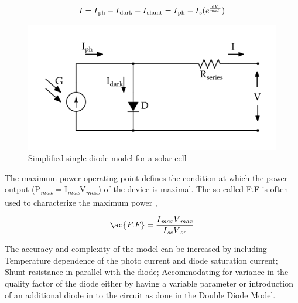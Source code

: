     \begin{equation}
    \begin{aligned}
     I = I\textsubscript{ph} - I\textsubscript{dark} - I\textsubscript{shunt} = I\textsubscript{ph} -  I\textsubscript{s} (e^{\frac{eV}{\textit{mk}T}})
      \label{eq:equ_new_cell_current}
      \end{aligned}
      \end{equation}
  
     
 \begin{figure}[H]
   \begin{center}
   \includegraphics[width=\textwidth]{images/simplified_single_diode_model_simple}
   \caption{ Simplified single diode model for a solar cell }
   \label{fig:simple_EQu_cell}
   \end{center}
   \end{figure}

The maximum-power operating point defines the condition at which the power output (P\textsubscript{\textit{max}} = I\textsubscript{\textit{max}}V\textsubscript{\textit{max}}) of the device is maximal.
The so-called \ac{F.F} is often used to characterize the maximum power ,

\begin{equation}
 \begin{aligned}
  \ac{F.F} = \dfrac{I\textsubscript{\textit{max}}V\textsubscript{\textit{max}}}{I\textsubscript{\textit{sc}}V\textsubscript{\textit{oc}}}
   \label{eq:equ_current_new}
   \end{aligned}
   \end{equation}
   
The accuracy and complexity of the model can be increased by including Temperature dependence of the photo current and diode saturation current; Shunt resistance in parallel with the diode; Accommodating for variance in the quality factor of the diode either by having a variable parameter or introduction of an additional diode in to the circuit as done in the Double Diode Model.


